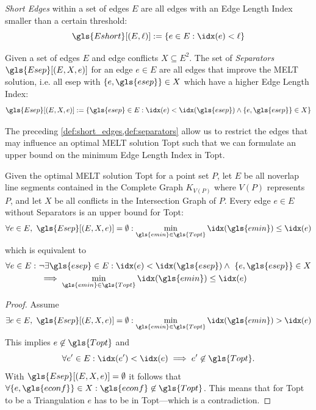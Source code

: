 \begin{definition}
  \label{def:short_edges}
  \emph{Short Edges} within a set of edges \(E\) are all edges with an
  Edge Length Index smaller than a certain threshold:
  \[
    \gls{Eshort}[(E, \ell)] := \{ e \in E : \idx(e) < \ell \}
  \]
\end{definition}
\vspace*{-1.5em}
\begin{definition}[Separators]
  \label{def:separators}
  Given a set of edges \(E\) and edge conflicts \(X \subseteq E^2\). 
  The set of \emph{Separators} \(\gls{Esep}[(E, X, e)]\) 
  for an edge \(e \in E\) are all edges
  that improve the \gls{MELT} solution, i.e. all \gls{esep} with
  \(\{e,\gls{esep}\} \in X\) which have a higher Edge Length Index:
  \[
	  \gls{Esep}[(E,X,e)] := \{
		  \gls{esep} \in E:
		  \idx(e) < \idx(\gls{esep}) \land \{e,\gls{esep}\} \in X
	  \}
  \]
\end{definition}

The preceding \cref{def:short_edges,def:separators} allow us to
restrict the edges that may influence an optimal \gls{MELT} solution
\gls{Topt} such that we can formulate an upper bound on the minimum
Edge Length Index in \gls{Topt}.

\begin{theorem}
  \label{thm:upper_bound}
  Given the optimal \gls{MELT} solution \gls{Topt}
  for a point set \(P\), let \(E\) be all \gls{noverlap} line segments
  contained in the Complete Graph \(K_{V(P)}\)
  where \(V(P)\) represents \(P\),
  and let \(X\) be all conflicts in the Intersection Graph of \(P\).
  Every edge \(e \in E\) without Separators
  is an upper bound for \gls{Topt}:
  \[
    \forall e \in E,~ \gls{Esep}[(E,X,e)] = \emptyset :
    \min\limits_{\gls{emin} \in \gls{Topt}}
    \idx(\gls{emin}) \leq \idx(e)
  \]
  which is equivalent to
  \begin{alignat*}{1}
    \forall e \in E:~ 
    &\lnot\exists \gls{esep} \in E:
    \idx(e) < \idx(\gls{esep})
    \land~ \{e, \gls{esep}\} \in X \\
    &\implies \min\limits_{\gls{emin} \in \gls{Topt}}
    \idx(\gls{emin}) \leq \idx(e)
  \end{alignat*}
  \begin{proof}
  Assume
  \[
    \exists e \in E,~ \gls{Esep}[(E,X,e)] = \emptyset :
    \min\limits_{\gls{emin} \in \gls{Topt}}
    \idx(\gls{emin}) > \idx(e)
  \]
  This implies \(e \not\in \gls{Topt}\) and
  \[
    \forall e' \in E:
    \idx(e') < \idx(e)
    \implies e' \not\in \gls{Topt}.
  \]
  With \(\gls{Esep}[(E,X,e)] = \emptyset\) it follows that
  \(
    \forall \{e, \gls{econf}\} \in X :
    \gls{econf} \not\in \gls{Topt}
  \).
  This means that for \gls{Topt} to be a Triangulation
  \(e\) has to be in \gls{Topt}---which is a contradiction.
  \end{proof}
\end{theorem}


